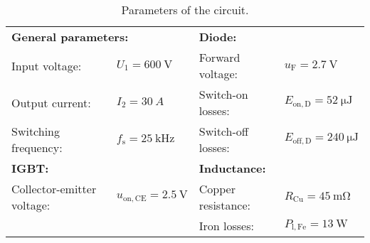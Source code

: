 %
\begin{table}[ht]
    \centering  %
    \begin{tabular}{llll}
        \toprule
        \multicolumn{2}{l}{\textbf{General parameters:}} & \multicolumn{2}{l}{\textbf{Diode:}} \\ 
        Input voltage: &  $U_{\mathrm{1}} = \SI{600}{\volt}$ & Forward voltage: & $u_{\mathrm{F}} = \SI{2.7}{\volt}$ \\
        Output current: & $I_2 = \SI{30}{A}$  & Switch-on losses: & $E_{\text{on},\mathrm{D}} = \SI{52}{\micro\joule}$ \\
        Switching frequency: & $f_{\mathrm{s}} = \SI{25}{\kilo\hertz}$  & Switch-off losses: & $E_{\text{off},\mathrm{D}} = \SI{240}{\micro\joule}$ \\
        \midrule
        \multicolumn{2}{l}{\textbf{IGBT:}} & \multicolumn{2}{l}{\textbf{Inductance:}} \\ 
        Collector-emitter voltage: & $u_{\mathrm{on},\mathrm{CE}} = \SI{2.5}{\volt}$ & Copper resistance: & $R_{\text{Cu}} = \SI{45}{\milli\ohm}$  \\
        & &  Iron losses: & $P_{\mathrm{l},\text{Fe}} = \SI{13}{\watt}$ \\
        \bottomrule
    \end{tabular}
    \caption{Parameters of the circuit.}  %
    \label{table:ex01_Parameters of the circuit}
\end{table}
%



